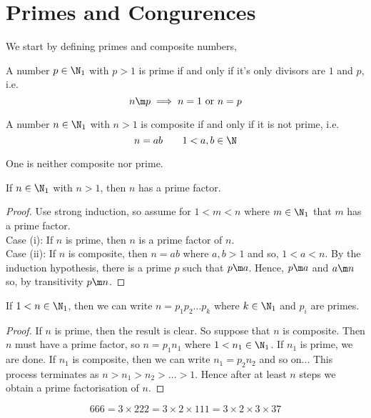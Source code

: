 
\section{Primes and Congurences}

We start by defining primes and composite numbers,
\begin{ndefi}[Prime]
  A number $p \in \N_1$ with $p > 1$ is prime if and only if it's only divisors are $1$ and $p$, i.e.
  $$ n \m p \implies n = 1 \text{ or } n = p $$
\end{ndefi}
\begin{ndefi}
  A number $n \in \N_1$ with $n > 1$ is composite if and only if it is not prime, i.e.
  $$ n = ab \qquad 1 < a, b \in \N  $$
\end{ndefi}
One is neither composite nor prime.

\begin{nprop}
  If $n \in \N_1$ with $n > 1$, then $n$ has a prime factor.
\end{nprop}
\begin{proof}
  Use strong induction, so assume for $1 < m < n$ where $m \in \N_1$ that $m$ has a prime factor. \\
  Case (i): If $n$ is prime, then $n$ is a prime factor of $n$.\\
  Case (ii): If $n$ is composite, then $n = ab$ where $a, b > 1$ and so, $1 < a < n$. By the induction hypothesis, there is a prime $p$ such that $p \m a$. Hence, $p \m a$ and $a \m n$ so, by transitivity $p \m n$.
\end{proof}

\begin{nprop}
   If $1 < n \in \N_1$, then we can write $n = p_1p_2\dots p_k$ where $k \in \N_1$ and $p_i$ are primes.
\end{nprop}
\begin{proof}
  If $n$ is prime, then the result is clear. So suppose that $n$ is composite. Then $n$ must have a prime factor, so $n = p_1n_1$ where $1 < n_1 \in \N_1$. If $n_1$ is prime, we are done. If $n_1$ is composite, then we can write $n_1 = p_2n_2$ and so on... This process terminates as $n > n_1 > n_2 > \dots > 1$. Hence after at least $n$ steps we obtain a prime factorisation of $n$.
\end{proof}

\begin{eg}
  $$ 666 = 3 \times 222 = 3 \times 2 \times 111 = 3 \times 2 \times 3 \times 37 $$
\end{eg}

